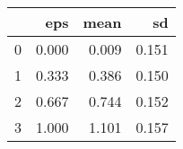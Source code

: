 \begin{tabular}{lrrr}
\toprule
{} &    eps &   mean &     sd \\
\midrule
0 &  0.000 &  0.009 &  0.151 \\
1 &  0.333 &  0.386 &  0.150 \\
2 &  0.667 &  0.744 &  0.152 \\
3 &  1.000 &  1.101 &  0.157 \\
\bottomrule
\end{tabular}
